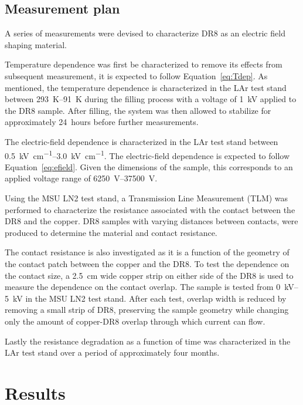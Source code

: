 \documentclass[a4paper,12pt]{article}
\newcommand{\DR}{DR8}
\begin{document}
\subsection{Measurement plan}

A series of measurements were devised to characterize {\DR} as an electric field shaping material. 

Temperature dependence was first be characterized to remove its effects from subsequent measurement, it is expected to follow Equation~\ref{eq:Tdep}.
As mentioned, the temperature dependence is characterized in the LAr test stand between \SIrange{293}{91}{\kelvin} during the filling process with a voltage of \SI{1}{\kilo\volt} applied to the {\DR} sample.
After filling, the system was then allowed to stabilize for approximately 24~hours before further measurements.

The electric-field dependence is characterized in the LAr test stand between \SIrange{0.5}{3.0}{\kilo\volt\per\centi\metre}. 
The electric-field dependence is expected to follow Equation~\ref{eq:efield}.
Given the dimensions of the sample, this corresponds to an applied voltage range of \SIrange{6250}{37500}{\volt}.
  
Using the MSU LN2 test stand, a Transmission Line Measurement (TLM) was performed to characterize the resistance associated with the contact between the {\DR} and the copper. 
{\DR} samples with varying distances between contacts, were produced to determine the material and contact resistance. 

The contact resistance is also investigated as it is a function of the geometry of the contact patch between the copper and the {\DR}.  
To test the dependence on the contact size, a \SI{2.5}{\centi\meter} wide copper strip on either side of the {\DR} is used to measure the dependence on the contact overlap. 
The sample is tested from \SIrange{0}{5}{\kilo\volt} in the MSU LN2 test stand.
After each test, overlap width is reduced by removing a small strip of {\DR}, preserving the sample geometry while changing only the amount of copper-{\DR} overlap through which current can flow.

Lastly the resistance degradation as a function of time was characterized in the LAr test stand over a period of approximately four months. 


\section{Results}
\label{sec:res}
\end{document}
